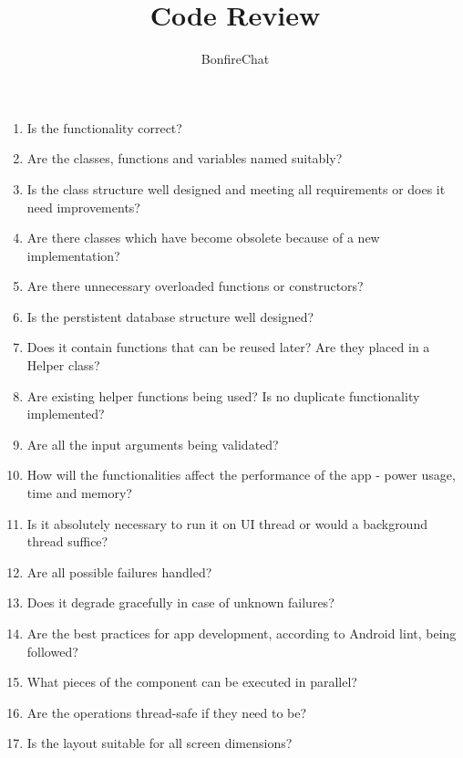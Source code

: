 \documentclass[accentcolor=tud2d,12pt,paper=a4,colorbacktitle]{tudexercise}
\title{Code Review}
\subtitle{BonfireChat}
\begin{document}
  \maketitle

  \begin{enumerate}[ 1.]
    \item Is the functionality correct?
    \item Are the classes, functions and variables named suitably?
    \item Is the class structure well designed and meeting all requirements or does it need improvements?
    \item Are there classes which have become obsolete because of a new implementation?
    \item Are there unnecessary overloaded functions or constructors?
    \item Is the perstistent database structure well designed?
    \item Does it contain functions that can be reused later? Are they placed in a Helper class?
    \item Are existing helper functions being used? Is no duplicate functionality implemented?
    \item Are all the input arguments being validated?
    \item How will the functionalities affect the performance of the app - power usage, time and memory?
    \item Is it absolutely necessary to run it on UI thread or would a background thread suffice?
    \item Are all possible failures handled?
    \item Does it degrade gracefully in case of unknown failures?
    \item Are the best practices for app development, according to Android lint, being followed?
    \item What pieces of the component can be executed in parallel?
    \item Are the operations thread-safe if they need to be?
    \item Is the layout suitable for all screen dimensions?
  \end{enumerate}
\end{document}
